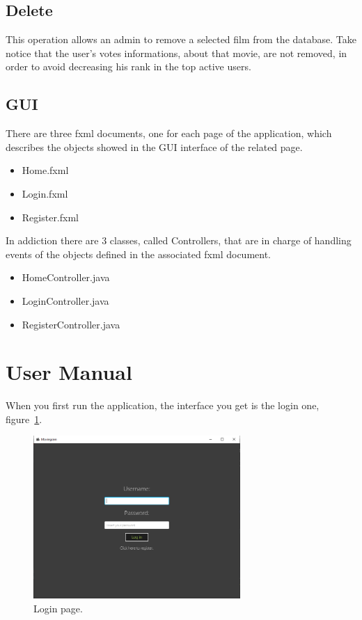 \documentclass[a4paper, oneside]{article}
\begin{document}
\subsection{Delete}
This operation allows an admin to remove a selected film from the database. Take notice that the user's votes informations, about that movie, are not removed, in order to avoid decreasing his rank in the top active users.
\vspace{2mm}

\vspace{5mm}

\clearpage

\subsection{GUI}
There are three fxml documents, one for each page of the application, which describes the objects showed in the GUI interface of the related page.
\begin{itemize}
\item Home.fxml
\item Login.fxml
\item Register.fxml
\end{itemize}
In addiction there are 3 classes, called Controllers, that are in charge of handling events of the objects defined in the associated fxml document.
\begin{itemize}
\item HomeController.java
\item LoginController.java
\item RegisterController.java
\end{itemize}

\clearpage
\section{User Manual}
When you first run the application, the interface you get is the login one, figure~\ref{fig:screen0}.
\begin{figure}[H]
\centering
\includegraphics[width=0.7\textwidth]{./images/screens/screen0} 
\caption{Login page.}
\label{fig:screen0}
\end{figure}
\end{document}

